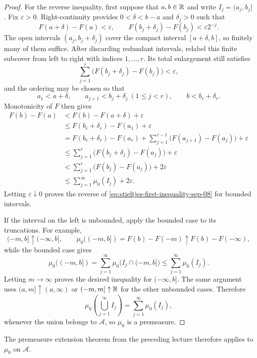 \begin{proof}
  For the reverse inequality, first suppose that $a,b\in\mathbb{R}$ and
  write $I_j=(a_j,b_j]$. Fix $\varepsilon>0$. Right-continuity provides
  $0<\delta<b-a$ and $\delta_j>0$ such that
  \[
    F(a+\delta)-F(a)<\varepsilon,
    \qquad
    F(b_j+\delta_j)-F(b_j)<\varepsilon 2^{-j}.
  \]
  The open intervals $(a_j,b_j+\delta_j)$ cover the compact interval
  $[a+\delta,b]$, so finitely many of them suffice. After discarding
  redundant intervals, relabel this finite subcover from left to right
  with indices $1,\ldots,r$. Its total enlargement still satisfies
  \[
    \sum_{j=1}^r\bigl(F(b_j+\delta_j)-F(b_j)\bigr)<\varepsilon,
  \]
  and the ordering may be chosen so that
  \[
    a_1<a+\delta,\qquad
    a_{j+1}<b_j+\delta_j\ (1\leq j<r),\qquad
    b<b_r+\delta_r.
  \]
  Monotonicity of $F$ then gives
  \begin{align*}
    F(b)-F(a)
    &<F(b)-F(a+\delta)+\varepsilon\\
    &\leq F(b_r+\delta_r)-F(a_1)+\varepsilon\\
    &=F(b_r+\delta_r)-F(a_r)
      +\sum_{j=1}^{r-1}\bigl(F(a_{j+1})-F(a_j)\bigr)
      +\varepsilon\\
    &\leq\sum_{j=1}^r
      \bigl(F(b_j+\delta_j)-F(a_j)\bigr)+\varepsilon\\
    &<\sum_{j=1}^r\bigl(F(b_j)-F(a_j)\bigr)+2\varepsilon\\
    &\leq\sum_{j=1}^{\infty}\mu_0(I_j)+2\varepsilon.
  \end{align*}
  Letting $\varepsilon\downarrow0$ proves the reverse of
  \eqref{eq:stieltjes-first-inequality-sep-08} for bounded intervals.

  If the interval on the left is unbounded, apply the bounded case to
  its truncations. For example,
  \[
    (-m,b]\uparrow(-\infty,b],
    \qquad
    \mu_0((-m,b])=F(b)-F(-m)\uparrow F(b)-F(-\infty),
  \]
  while the bounded case gives
  \[
    \mu_0((-m,b])
    =\sum_{j=1}^{\infty}\mu_0\bigl(I_j\cap(-m,b]\bigr)
    \leq\sum_{j=1}^{\infty}\mu_0(I_j).
  \]
  Letting $m\to\infty$ proves the desired inequality for
  $(-\infty,b]$. The same argument uses
  $(a,m]\uparrow(a,\infty)$ or $(-m,m]\uparrow\mathbb{R}$ for the other
  unbounded cases. Therefore
  \[
    \mu_0\left(\bigcup_{j=1}^{\infty}I_j\right)
    =\sum_{j=1}^{\infty}\mu_0(I_j),
  \]
  whenever the union belongs to $\mathcal A$, so $\mu_0$ is a
  premeasure.
\end{proof}

The premeasure extension theorem from the preceding lecture therefore
applies to $\mu_0$ on $\mathcal A$.

